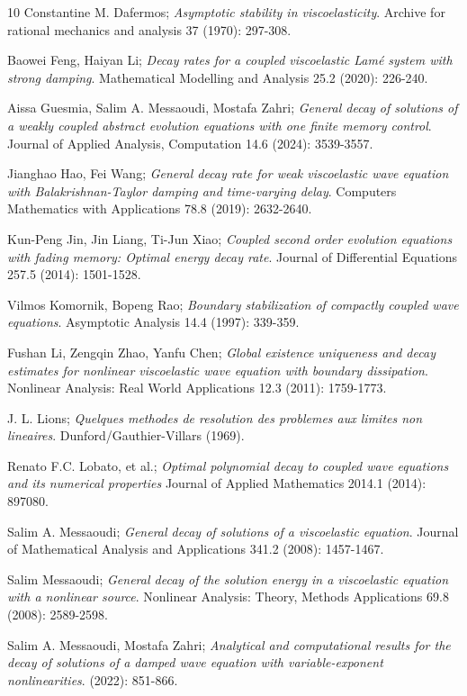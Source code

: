 \begin{thebibliography}{10}
 Constantine M. Dafermos;
\emph{Asymptotic stability in viscoelasticity}.
Archive for rational mechanics and analysis 37 (1970): 297-308.

 Baowei Feng, Haiyan Li;
\emph{Decay rates for a coupled viscoelastic Lam\'e system with strong damping}.
Mathematical Modelling and Analysis 25.2 (2020): 226-240.

 Aissa Guesmia, Salim A. Messaoudi, Mostafa Zahri;
\emph{General decay of solutions of a weakly coupled abstract evolution equations 
with one finite memory control}.
 Journal of Applied Analysis, Computation 14.6 (2024): 3539-3557.
 
 Jianghao Hao,  Fei Wang;
\emph{General decay rate for weak viscoelastic wave equation with Balakrishnan-Taylor 
damping and time-varying delay}.
Computers Mathematics with Applications 78.8 (2019): 2632-2640.

 Kun-Peng Jin, Jin Liang,  Ti-Jun Xiao;
\emph{Coupled second order evolution equations with fading memory: Optimal energy
 decay rate}. Journal of Differential Equations 257.5 (2014): 1501-1528.
 
 Vilmos Komornik, Bopeng Rao;
\emph{Boundary stabilization of compactly coupled wave equations}.
 Asymptotic Analysis 14.4 (1997): 339-359.
 
 Fushan Li, Zengqin Zhao, Yanfu Chen;
\emph{Global existence uniqueness and decay estimates for nonlinear viscoelastic 
wave equation with boundary dissipation}.
 Nonlinear Analysis: Real World Applications 12.3 (2011): 1759-1773.
 
 J. L. Lions;
\emph{Quelques methodes de resolution des problemes aux limites non lineaires}.
 Dunford/Gauthier-Villars (1969).
 
 Renato F.C. Lobato, et al.;
\emph{Optimal polynomial decay to coupled wave equations and its numerical properties}
 Journal of Applied Mathematics 2014.1 (2014): 897080.
 
 Salim A. Messaoudi;
\emph{General decay of solutions of a viscoelastic equation}.
Journal of Mathematical Analysis and Applications 341.2 (2008): 1457-1467.

 Salim Messaoudi;
\emph{General decay of the solution energy in a viscoelastic equation with a nonlinear 
source}. Nonlinear Analysis: Theory, Methods Applications 69.8 (2008): 2589-2598.

 Salim A. Messaoudi, Mostafa Zahri;
\emph{Analytical and computational results for the decay of solutions of a damped 
wave equation with variable-exponent nonlinearities}. (2022): 851-866.


\end{thebibliography}
